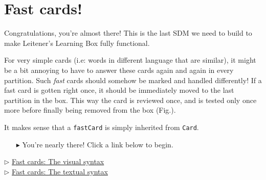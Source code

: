 \newpage
\section{Fast cards!}
\genHeader
\hypertarget{sec:fastCard}{}

Congratulations, you're almost there! This is the last SDM we need to build to make Leitener's Learning Box fully functional.

For very simple cards (i.e: words in different language that are similar), it might be a bit annoying to have to answer these cards again and again in every
partition. Such \emph{fast} cards should somehow be marked and handled differently! If a fast card is gotten right once, it should be immediately moved to the
last partition in the box. This way the card is reviewed once, and is tested only once more before finally being removed from the box (Fig.).


It makes sense that a \texttt{fastCard} is simply inherited from \texttt{Card}. 

\vspace{0.5cm}
\begin{itemize}
\item[$\blacktriangleright$] You're nearly there! Click a link below to begin.
\end{itemize}

\begin{center} {$\triangleright$ \hyperlink{fastCard vis}{Fast cards: The visual syntax}}%
\\ \vspace{0.5cm}
{$\triangleright$ \hyperlink{fastCard tex}{Fast cards: The textual syntax}}\end{center} 
 


